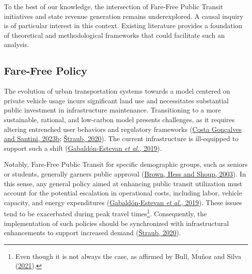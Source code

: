 \documentclass[12pt, a4paper, twoside]{article}
\numberwithin{equation}{subsection} %
\begin{document}
To the best of our knowledge, the intersection of Fare-Free Public
Transit initiatives and state revenue generation remains underexplored.
A causal inquiry is of particular interest in this context. Existing
literature provides a foundation of theoretical and methodological
frameworks that could facilitate such an analysis.

\hypertarget{sec-fftp-policy}{%
\subsection{Fare-Free Policy}\label{sec-fftp-policy}}

The evolution of urban transportation systems towards a model centered
on private vehicle usage incurs significant land use and necessitates
substantial public investment in infrastructure maintenance.
Transitioning to a more sustainable, rational, and low-carbon model
presents challenges, as it requires altering entrenched user behaviors
and regulatory frameworks
(\protect\hyperlink{ref-Gonuxe7alves_Santini_2023}{Costa Gonçalves and
Santini, 2023b}; \protect\hyperlink{ref-straub_2020}{Štraub, 2020}). The
current infrastructure is ill-equipped to support such a shift
(\protect\hyperlink{ref-Gabaldon_ffpt_2019}{Gabaldón-Estevan \emph{et
al.}, 2019}).

Notably, Fare-Free Public Transit for specific demographic groups, such
as seniors or students, generally garners public approval
(\protect\hyperlink{ref-Brown_2003}{Brown, Hess and Shoup, 2003}). In
this sense, any general policy aimed at enhancing public transit
utilization must account for the potential escalation in operational
costs, including labor, vehicle capacity, and energy expenditures
(\protect\hyperlink{ref-Gabaldon_ffpt_2019}{Gabaldón-Estevan \emph{et
al.}, 2019}). These issues tend to be exacerbated during peak travel
times\footnote{Even though it is not always the case, as affirmed by
  Bull, Muñoz and Silva (\protect\hyperlink{ref-BULL-RCT-2021}{2021}).}.
Consequently, the implementation of such policies should be synchronized
with infrastructural enhancements to support increased demand
(\protect\hyperlink{ref-straub_2020}{Štraub, 2020}).
\end{document}
